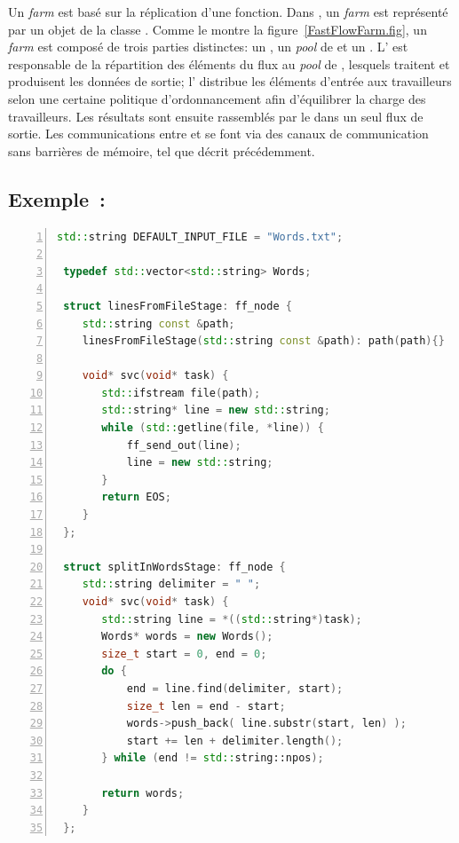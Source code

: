 Un \emph{farm} est bas\'e sur la r\'eplication d'une fonction. Dans , un \emph{farm} est repr\'esent\'e par un objet de la classe . Comme le montre la figure~\ref{FastFlowFarm.fig}, un \emph{farm} est compos\'e de trois parties distinctes: un , un  \emph{pool} de  et un . L' est responsable de la r\'epartition des \'el\'ements du flux au \emph{pool} de , lesquels traitent et produisent les donn\'ees de sortie; l' distribue les \'el\'ements d'entr\'ee aux travailleurs selon une certaine politique d'ordonnancement afin d'\'equilibrer la charge des travailleurs. Les r\'esultats sont ensuite rassembl\'es par le  dans un seul flux de sortie. Les communications entre  et  se font via des canaux de communication sans barri\`eres de m\'emoire, tel que d\'ecrit pr\'ec\'edemment.


\subsection{Exemple~: }


\begin{lstlisting}[language=c++, 
caption={Le code source \TT{FastFlow} d'une application pour compter le nombre d'occurrences de mots.},
label={wordcountFastFlow},
frame=single,
float,
numbers=left
]
 std::string DEFAULT_INPUT_FILE = "Words.txt";
 
 typedef std::vector<std::string> Words;
 
 struct linesFromFileStage: ff_node {
    std::string const &path;
    linesFromFileStage(std::string const &path): path(path){}
 
    void* svc(void* task) {
       std::ifstream file(path);
       std::string* line = new std::string;
       while (std::getline(file, *line)) {
           ff_send_out(line);
           line = new std::string;
       }
       return EOS;
    }
 };
 
 struct splitInWordsStage: ff_node {
    std::string delimiter = " ";
    void* svc(void* task) {
       std::string line = *((std::string*)task);
       Words* words = new Words();
       size_t start = 0, end = 0;
       do {
           end = line.find(delimiter, start);
           size_t len = end - start;
           words->push_back( line.substr(start, len) );
           start += len + delimiter.length();
       } while (end != std::string::npos);

       return words;
    }
 };
\end{lstlisting}
 
